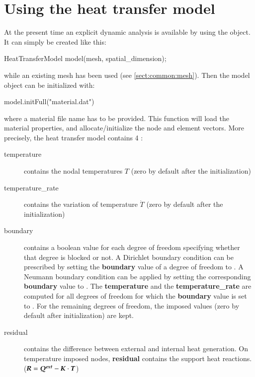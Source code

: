 \section{Using the heat transfer model}
At the present time an explicit dynamic analysis is available by
using the   object.
It can simply be created like this:
\begin{cpp}
  HeatTransferModel model(mesh, spatial_dimension);
\end{cpp}
while an existing mesh has been used (see \ref{sect:common:mesh}).
Then the model object can be initialized with:
\begin{cpp}
  model.initFull("material.dat")
\end{cpp}
where a material file name has to be provided. This function will load the material 
properties, and allocate/initialize the node and element vectors.
More precisely, the heat transfer model contains 4 :
\begin{description}
\item[temperature] contains the nodal temperatures $T$ (zero  by   default  after  the
  initialization) 
\item[temperature\_rate] contains the variation of temperature $\dot{T}$ 
  (zero  by   default  after  the
  initialization) 

\item[boundary] contains a  boolean value for each degree  of freedom specifying
  whether that degree  is blocked or not. A Dirichlet  boundary condition can be
  prescribed by  setting the \textbf{boundary} value  of a degree  of freedom to
  .   A Neumann  boundary condition  can  be applied  by setting  the
  corresponding     \textbf{boundary}     value     to    .      The
  \textbf{temperature} and  the \textbf{temperature\_rate} are  computed for all
  degrees  of  freedom   for  which  the  \textbf{boundary}  value   is  set  to
  .  For the remaining degrees  of freedom, the imposed values (zero
  by default after  initialization) are kept.

\item[residual] contains the difference between external and internal heat generation. On
  temperature imposed nodes,  \textbf{residual} contains the support heat reactions. ($\boldsymbol{R} = \boldsymbol{Q^{ext}} -\boldsymbol{K} \cdot \boldsymbol{T}$)
\end{description}

